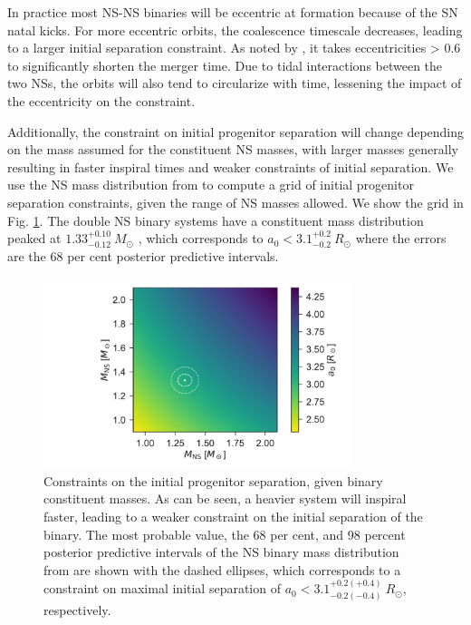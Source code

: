 \documentclass{aa}    %
\begin{document}
In practice most NS-NS binaries will be eccentric at formation because of the SN
natal kicks. For more eccentric orbits, the coalescence timescale decreases,
leading to a larger initial separation constraint. As noted by
\citet{Postnov2014}, it takes eccentricities > 0.6 to significantly shorten the
merger time. Due to tidal interactions between the two NSs, the orbits will also
tend to circularize with time, lessening the impact of the eccentricity on the
constraint.

Additionally, the constraint on initial progenitor separation will change
depending on the mass assumed for the constituent NS masses, with larger masses
generally resulting in faster inspiral times and weaker constraints of initial
separation. We use the NS mass distribution from \citet{Kiziltan2013} to compute
a grid of initial progenitor separation constraints, given the range of NS
masses allowed. We show the grid in Fig. \ref{fig:prog_sep}. The double NS
binary systems have a constituent mass distribution peaked at
$1.33^{+0.10}_{-0.12}~M_\odot$ \citep{Kiziltan2013}, which corresponds to  $a_0 <
3.1^{+0.2}_{-0.2}~R_\odot$ where the errors are the 68 per cent posterior
predictive intervals.

\begin{figure}
	\centering
	\includegraphics[width=9cm]{figures/prog_sep.pdf}
	\caption{Constraints on the initial progenitor separation, given binary constituent masses. As can be seen, a heavier system will inspiral faster, leading to a weaker constraint on the initial separation of the binary. The most probable value, the 68 per cent, and 98 percent posterior predictive intervals of the NS binary mass distribution from \citet{Kiziltan2013} are shown with the dashed ellipses, which corresponds to a constraint on maximal initial separation of $a_0 <3.1^{+0.2(+0.4)}_{-0.2(-0.4)}~R_\odot$, respectively.}
	\label{fig:prog_sep}
\end{figure}
\end{document}
